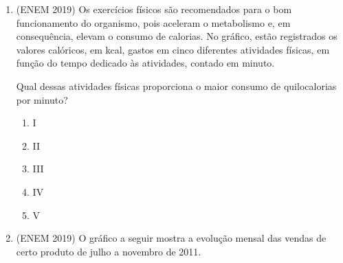 \begin{enumerate}
\item (ENEM 2019) Os exercícios físicos são recomendados para o bom funcionamento do organismo, pois aceleram o metabolismo e, em consequência, elevam o consumo de calorias. No gráfico, estão registrados os valores calóricos, em kcal, gastos em cinco diferentes atividades físicas, em função do tempo dedicado às atividades, contado em minuto.

\begin{figure}[H]
\centering
{}
\end{figure}

  Qual dessas atividades físicas proporciona o maior consumo de quilocalorias por minuto?

  \begin{enumerate}
  \item I
  \item II
  \item III
  \item IV
  \item V
  \end{enumerate}

\item (ENEM 2019) O gráfico a seguir mostra a evolução mensal das vendas de certo produto de julho a novembro de 2011.

  \begin{center}
\end{center}
\end{enumerate}
